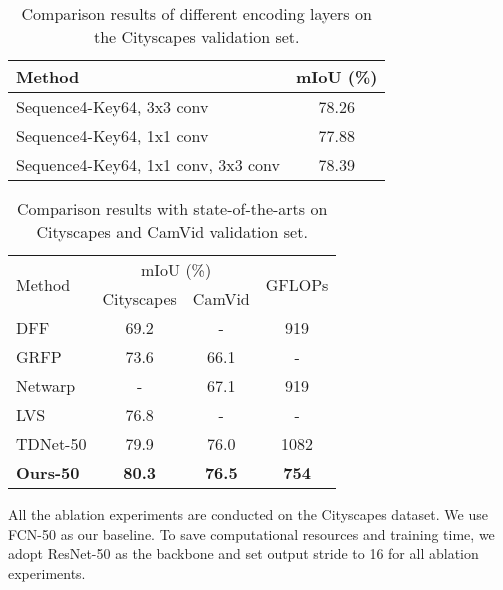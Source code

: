 \documentclass{article}
\begin{document}
	\begin{table}[t]
		\caption{Comparison results of different encoding layers on the Cityscapes validation set.}
		\vspace{-0.3cm}
		\begin{center}
			\begin{tabular}{l | c }
				\hline
				Method & mIoU (\%) \\
				\hline\hline
				Sequence4-Key64, 3x3 conv & 78.26 \\
				Sequence4-Key64, 1x1 conv & 77.88 \\
				Sequence4-Key64, 1x1 conv, 3x3 conv & 78.39 \\
				\hline
			\end{tabular}
		\end{center}
		\vspace{-0.5cm}
		\label{ablation 02}
	\end{table}
	
	
	
	\begin{table}
		\vspace{-0.3cm}
		\caption{Comparison results with state-of-the-arts on Cityscapes and CamVid validation set.}
		\vspace{-0.3cm}
		\begin{center}
\begin{tabular}{l | c | c | c}
    			\hline
    			\multirow{2}{*}{Method} & \multicolumn{2}{c|}{mIoU (\%)} & \multirow{2}{*}{GFLOPs} \\
    			& Cityscapes & CamVid & \\
    			\hline\hline
    			DFF \cite{DFF2017} & 69.2 & - & 919 \\
    			GRFP \cite{GRFP2018} & 73.6 & 66.1 & - \\
    			Netwarp \cite{netwarping2017} & - & 67.1 & 919 \\
    			LVS \cite{LVS2018} & 76.8 & - & - \\
\hline
    			TDNet-50 \cite{TDNet2019} & 79.9 & 76.0 & 1082 \\
    			\hline
    			\textbf{Ours-50} & \textbf{80.3} & \textbf{76.5} & \bf{754} \\
    			\hline
    		\end{tabular}
    	\end{center}
		\vspace{-0.7cm}
		\label{sota}
	\end{table}
	
	All the ablation experiments are conducted on the Cityscapes dataset. We use FCN-50\cite{FCN2015} as our baseline. To save computational resources and training time, we adopt ResNet-50 as the backbone and set output stride to 16 for all ablation experiments. 
\end{document}
